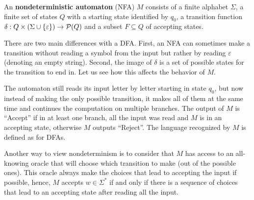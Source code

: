 \documentclass[main.tex]{subfiles}
\begin{document}
\begin{defn}
	An \textbf{nondeterministic automaton} (NFA) $M$ consists of a finite alphabet $\Sigma$, a finite set of states $Q$ with a starting state identified by $q_0$, a transition function $\delta : Q \times (\Sigma \cup \{\varepsilon\}) \rightarrow \mathcal{P}(Q)$ and a subset $F \subseteq Q$ of accepting states.
	
	There are two main differences with a DFA. First, an NFA can sometimes make a transition without reading a symbol from the input but rather by reading $\varepsilon$ (denoting an empty string). Second, the image of $\delta$ is a set of possible states for the transition to end in. Let us see how this affects the behavior of $M$.
	
	The automaton still reads its input letter by letter starting in state $q_0$, but now instead of making the only possible transition, it makes all of them at the same time and continues the computation on multiple branches. The output of $M$ is ``Accept'' if in at least one branch, all the input was read and $M$ is in an accepting state, otherwise $M$ outputs ``Reject''. The language recognized by $M$ is defined as for DFAs.
	
	Another way to view nondeterminism is to consider that $M$ has access to an all-knowing oracle that will choose which transition to make (out of the possible ones). This oracle always make the choices that lead to accepting the input if possible, hence, $M$ accepts $w \in \Sigma^*$ if and only if there is a sequence of choices that lead to an accepting state after reading all the input.
\end{defn}
\end{document}
